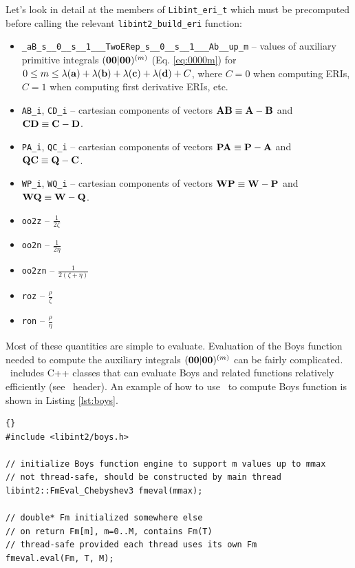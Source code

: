 \documentclass[10pt]{article}
\begin{document}
Let's look in detail at the members of {\tt Libint\_eri\_t} which must be precomputed before
calling the relevant {\tt libint2\_build\_eri} function:
\begin{itemize}
\item {\tt \_aB\_s\_\_0\_\_s\_\_1\_\_\_TwoERep\_s\_\_0\_\_s\_\_1\_\_\_Ab\_\_up\_m} --
values of auxiliary primitive integrals $({\bf 00}|{\bf 00})^{(m)}$ (Eq.
\eqref{eq:0000m}) for $0 \leq m \leq \lambda({\bf a}) + \lambda({\bf b}) +
\lambda({\bf c}) + \lambda({\bf d}) + C$, where $C = 0$ when computing ERIs, $C=1$ when computing first derivative ERIs, etc.
\item {\tt AB\_i}, {\tt CD\_i} -- cartesian components of vectors ${\bf AB} \equiv {\bf A} - {\bf B}$
and ${\bf CD} \equiv {\bf C} - {\bf D}$.
\item {\tt PA\_i}, {\tt QC\_i} -- cartesian components of vectors ${\bf PA} \equiv {\bf P} - {\bf A}$
and ${\bf QC} \equiv {\bf Q} - {\bf C}$.
\item {\tt WP\_i}, {\tt WQ\_i} -- cartesian components of vectors ${\bf WP} \equiv {\bf W} - {\bf P}$
and ${\bf WQ} \equiv {\bf W} - {\bf Q}$.
\item {\tt oo2z} -- $\frac{1}{2\zeta}$
\item {\tt oo2n} -- $\frac{1}{2\eta}$
\item {\tt oo2zn} -- $\frac{1}{2(\zeta+\eta)}$
\item {\tt roz} -- $\frac{\rho}{\zeta}$
\item {\tt ron} -- $\frac{\rho}{\eta}$
\end{itemize}
Most of these quantities are simple to evaluate. Evaluation of the Boys function needed to compute
the auxiliary integrals $({\bf 00}|{\bf 00})^{(m)}$ can be fairly complicated.\cite{Gill91}
\LIBINT\ includes C++ classes that can evaluate Boys and related functions relatively
efficiently (see \boysh\ header). An example of how to use \LIBINT\ to compute Boys function
is shown in Listing \ref{lst:boys}.
\begin{lstlisting}[label=lst:boys,caption=Computation of Boys function using \LIBINT.]{}
#include <libint2/boys.h>

// initialize Boys function engine to support m values up to mmax
// not thread-safe, should be constructed by main thread
libint2::FmEval_Chebyshev3 fmeval(mmax);

// double* Fm initialized somewhere else
// on return Fm[m], m=0..M, contains Fm(T)
// thread-safe provided each thread uses its own Fm
fmeval.eval(Fm, T, M);
\end{lstlisting}
\end{document}
